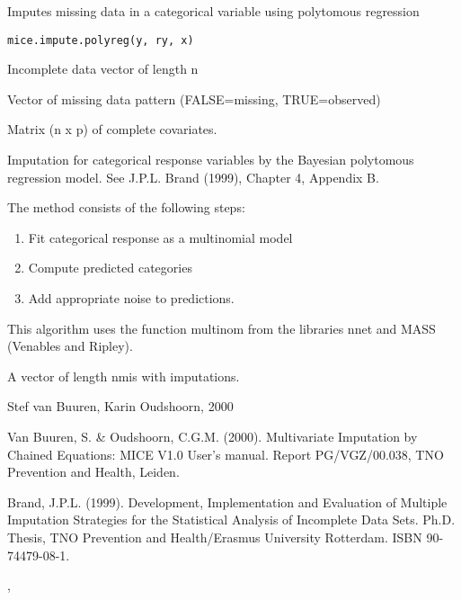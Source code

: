 \begin{Description}\relax
Imputes missing data in a categorical variable using polytomous regression
\end{Description}
\begin{Usage}
\begin{verbatim}
mice.impute.polyreg(y, ry, x)
\end{verbatim}
\end{Usage}
\begin{Arguments}
\begin{ldescription}
\item[\code{y}] Incomplete data vector of length n
\item[\code{ry}] Vector of missing data pattern (FALSE=missing, TRUE=observed)
\item[\code{x}] Matrix (n x p) of complete covariates.
\end{ldescription}
\end{Arguments}
\begin{Details}\relax
Imputation for categorical response variables by the Bayesian 
polytomous regression model. See J.P.L. Brand (1999), Chapter 4,
Appendix B.

The method consists of the following steps:
\begin{enumerate}
\item Fit categorical response as a multinomial model 
\item Compute predicted categories
\item Add appropriate noise to predictions.
\end{enumerate}
This algorithm uses the function multinom from the libraries nnet and MASS
(Venables and Ripley).
\end{Details}
\begin{Value}
A vector of length nmis with imputations.
\end{Value}
\begin{Author}\relax
Stef van Buuren, Karin Oudshoorn, 2000
\end{Author}
\begin{References}\relax
Van Buuren, S. \& Oudshoorn, C.G.M. (2000). Multivariate Imputation by Chained Equations: 
MICE V1.0 User's manual. Report PG/VGZ/00.038, TNO Prevention and Health, Leiden.

Brand, J.P.L. (1999). Development, Implementation and Evaluation of Multiple Imputation Strategies for the Statistical Analysis of Incomplete Data Sets. Ph.D. Thesis, TNO Prevention and Health/Erasmus University Rotterdam. ISBN 90-74479-08-1.
\end{References}
\begin{SeeAlso}\relax
{}, 
\end{SeeAlso}

